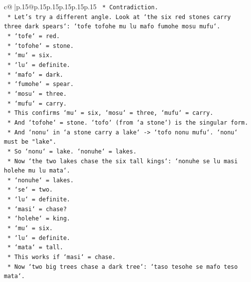 \documentclass{article}
\begin{document}
{\begin{supertabular}{c@{$\;$}|p{.15\linewidth}@{}p{.15\linewidth}p{.15\linewidth}p{.15\linewidth}p{.15\linewidth}p{.15\linewidth}}
{{{\texttt{                            *   Contradiction.} \\
\texttt{            *   Let's try a different angle. Look at `the six red stones carry three dark spears`: `tofe tofohe mu lu mafo fumohe mosu mufu`.} \\
\texttt{                *   `tofe` = red.} \\
\texttt{                *   `tofohe` = stone.} \\
\texttt{                *   `mu` = six.} \\
\texttt{                *   `lu` = definite.} \\
\texttt{                *   `mafo` = dark.} \\
\texttt{                *   `fumohe` = spear.} \\
\texttt{                *   `mosu` = three.} \\
\texttt{                *   `mufu` = carry.} \\
\texttt{                *   This confirms `mu` = six, `mosu` = three, `mufu` = carry.} \\
\texttt{                *   And `tofohe` = stone. `tofo` (from `a stone`) is the singular form.} \\
\texttt{                *   And `nonu` in `a stone carry a lake` {-}> `tofo nonu mufu`. `nonu` must be "lake".} \\
\texttt{                *   So `nonu` = lake. `nonuhe` = lakes.} \\
\texttt{                *   Now `the two lakes chase the six tall kings`: `nonuhe se lu masi holehe mu lu mata`.} \\
\texttt{                    *   `nonuhe` = lakes.} \\
\texttt{                    *   `se` = two.} \\
\texttt{                    *   `lu` = definite.} \\
\texttt{                    *   `masi` = chase?} \\
\texttt{                    *   `holehe` = king.} \\
\texttt{                    *   `mu` = six.} \\
\texttt{                    *   `lu` = definite.} \\
\texttt{                    *   `mata` = tall.} \\
\texttt{                    *   This works if `masi` = chase.} \\
\texttt{                *   Now `two big trees chase a dark tree`: `taso tesohe se mafo teso mata`.} \\
}}}
\end{supertabular}}
\end{document}
